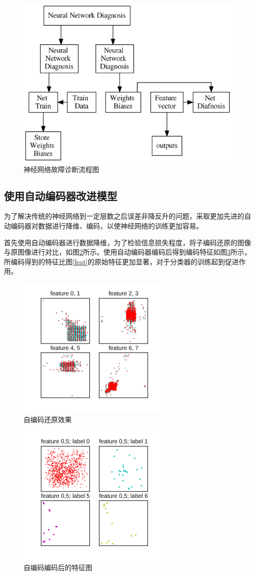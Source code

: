 \documentclass{exam}
\begin{document}
\begin{figure}
\centering
    \includegraphics[width=0.8\hsize]{fig/cd/procedure.eps.png}
    \caption{神经网络故障诊断流程图}
    \label{nn}
\end{figure}

\subsection{使用自动编码器改进模型}
为了解决传统的神经网络到一定层数之后误差非降反升的问题，采取更加先进的自动编码器对数据进行降维、编码，以使神经网络的训练更加容易。

首先使用自动编码器进行数据降维，为了检验信息损失程度，将子编码还原的图像与原图像进行对比，如图\ref{ae_re}所示。使用自动编码器编码后得到编码特征如图\ref{ae_enc}所示，所编码得到的特征比图\ref{feat}的原始特征更加显著，对于分类器的训练起到促进作用。

\begin{figure}
\centering
\includegraphics[width=0.4\hsize]{fig/cd/autoencoder_restore.eps.png}
\caption{自编码还原效果}
\label{ae_re}
\end{figure}

\begin{figure}
\centering
\includegraphics[width=0.4\hsize]{fig/cd/autoencoder_encoded_features.eps.png}
\caption{自编码编码后的特征图}
\label{ae_enc}
\end{figure}
\end{document}
